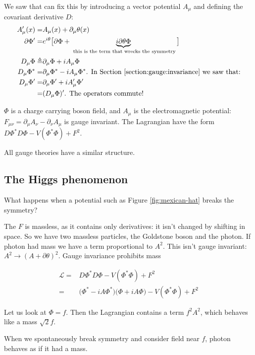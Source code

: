 \documentclass[]{article}
\begin{document}
We saw that can fix this by introducing a vector potential $A_\mu$ and defining the covariant derivative $D$:
\begin{align*}
	A^\prime_\mu(x) =& A_\mu(x) + \partial_\mu \theta(x)\\
	\partial \Phi^\prime =& e^{i\theta} \big[\partial \Phi + \underbrace{i \partial \theta \Phi}_\text{ this is the term that wrecks the symmetry}\big] \\
	D_\mu \Phi \triangleq& \partial_\mu \Phi + i A_\mu \Phi\\
	D_\mu \Phi^* =& \partial_\mu \Phi^* - i A_\mu \Phi^* \text{. In Section \ref{section:gauge:invariance} we saw that:}\\
	D_\mu \Phi^\prime =& \partial_\mu \Phi^\prime + i A^\prime_\mu \Phi^\prime \\
	=& (D_\mu \Phi)^\prime \text{. The operators commute!}
\end{align*}

$\Phi$ is a charge carrying boson field, and $A_\mu$ is the electromagnetic potential: $F_{\mu\nu}=\partial_\mu A_\nu-\partial_\nu A_\mu$ is gauge invariant. The Lagrangian have the form $D\Phi^* D\Phi -V(\Phi^*\Phi) +F^2$. 

All gauge theories have a similar structure.

\subsection{The Higgs phenomenon}

What happens when a potential such as Figure \ref{fig:mexican-hat} breaks the symmetry?

The $F$ is massless, as it contains only derivatives: it isn't changed by shifting in space. So we have two massless particles, the Goldstone boson and the photon. If photon had mass we have a term proportional to $A^2$. This isn't gauge invariant: $A^2 \rightarrow (A+\partial \theta)^2$. Gauge invariance prohibits mass

\begin{align*}
	\mathcal{L} =& D\Phi^* D\Phi -V(\Phi^*\Phi) +F^2\\
	=& \big( \Phi^* - i A \Phi^*\big) \big( \Phi + i A \Phi\big) -V(\Phi^*\Phi) +F^2
\end{align*}

Let us look at $\Phi = f$. Then the Lagrangian contains a term $f^2A^2$, which behaves like a mass $\sqrt{2}f$.

When we spontaneously break symmetry and consider field near $f$, photon behaves as if it had a mass.
\end{document}

